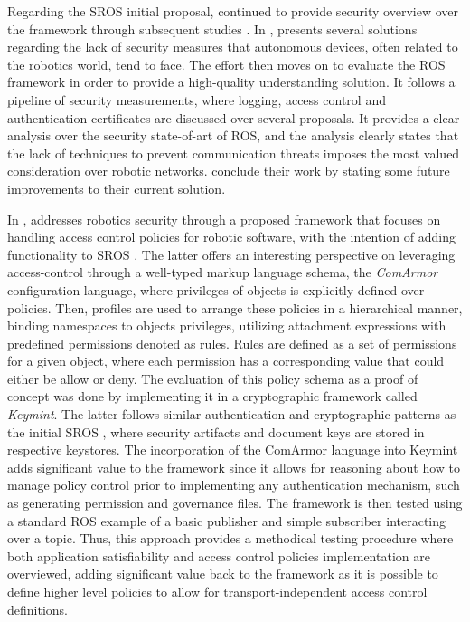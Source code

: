 Regarding the SROS \cite{white2016sros} initial proposal, \citeauthor{white2018procedurally} continued to provide security overview over the framework through subsequent studies \cite{white2018procedurally, white2019network}. In , \citeauthor*{caiazza2019enhancing} presents several solutions regarding the lack of security measures that autonomous devices, often related to the robotics world, tend to face. The effort then moves on to evaluate the ROS framework in order to provide a high-quality understanding solution. It follows a pipeline of security measurements, where logging, access control and authentication certificates are discussed over several proposals. It provides a clear analysis over the security state-of-art of ROS, and the analysis clearly states that the lack of techniques to prevent communication threats imposes the most valued consideration over robotic networks. \citeauthor*{caiazza2019enhancing} conclude their work by stating some future improvements to their current solution. 

In , \citeauthor*{white2018procedurally} addresses robotics security through a proposed framework that focuses on handling access control policies for robotic software, with the intention of adding functionality to SROS \cite{white2016sros}. The latter offers an interesting perspective on leveraging access-control through a well-typed markup language schema, the \textit{ComArmor} configuration language, where privileges of objects is explicitly defined over policies. Then, profiles are used to arrange these policies in a hierarchical manner, binding namespaces to objects privileges, utilizing attachment expressions with predefined permissions denoted as rules. Rules are defined as a set of permissions for a given object, where each permission has a corresponding value that could either be allow or deny. The evaluation of this policy schema as a proof of concept was done by implementing it in a cryptographic framework called \textit{Keymint}. The latter follows similar authentication and cryptographic patterns as the initial SROS \cite{white2016sros}, where security artifacts and document keys are stored in respective keystores. The incorporation of the ComArmor language into Keymint adds significant value to the framework since it allows for reasoning about how to manage policy control prior to implementing any authentication mechanism, such as generating permission and governance files. The framework is then tested using a standard ROS example of a basic publisher and simple subscriber interacting over a topic. Thus, this approach provides a methodical testing procedure where both application satisfiability and access control policies implementation are overviewed, adding significant value back to the framework as it is possible to define higher level policies to allow for transport-independent access control definitions.

